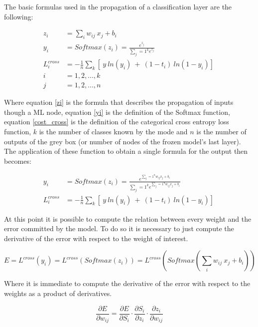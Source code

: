 \documentclass[12pt]{report}
\begin{document}
The basic formulas used in the propagation of a classification layer are the following:

\begin{align} 
	z_i &= \sum_i w_{ij} \: x_j + b_i \label{zi} \\ 
	y_i &= Softmax(z_i) = \frac{e^{z_j}}{\sum_j=1^k e^{z_j}} 	\label{yi} \\
	L^{cross}_i &= - \frac{1}{n} \sum_k [\ y \: ln(y_i) \: +\: (1-t_i) \: ln(1-y_i) ]\ \label{cost_cross} \\
	i   &= 1, 2, ...,k \nonumber \\
	j   &= 1, 2, ...,n \nonumber
\end{align}

Where equation \ref{zi} is the formula that describes the propagation of inputs though a ML node, equation \ref{yi} is the definition of the Softmax function, equation \ref{cost_cross} is the definition of the categorical cross entropy loss function, $k$ is the number of classes known by the mode and $n$ is the number of outputs of the grey box (or number of nodes of the frozen model's last layer).\\
The application of these function to obtain a single formula for the output then becomes:

\begin{align}
	y_i         &=  Softmax(z_i) = \frac{e^{\sum_j=1^n w_{ij} x_j+b_i}}{\sum_j=1^k  e^{\sum_j=1^n w_{ij} x_j+b_i}} \\
	L^{cross}_i &= - \frac{1}{n} \sum_k [\ y \: ln(y_i) \: +\: (1-t_i) \: ln(1-y_i) ]\ 
\end{align}

At this point it is possible to compute the relation between every weight and the error committed by the model. To do so it is necessary to just compute the derivative of the error with respect to the weight of interest. 


\begin{equation}
	E = L^{cross}(y_i) = L^{cross}(Softmax(z_i)) = L^{cross}(Softmax(\sum_i w_{ij} \: x_j + b_i))  
\end{equation}

Where it is immediate to compute the derivative of the error with respect to the weights as a product of derivatives.

\begin{equation}
	\frac{\partial E}{\partial w_{ij}} = \frac{\partial E}{\partial S_i} \cdot \frac{\partial S_i}{\partial z_i} \cdot \frac{\partial z_i}{\partial w_{ij}}  
\end{equation}
\end{document}
